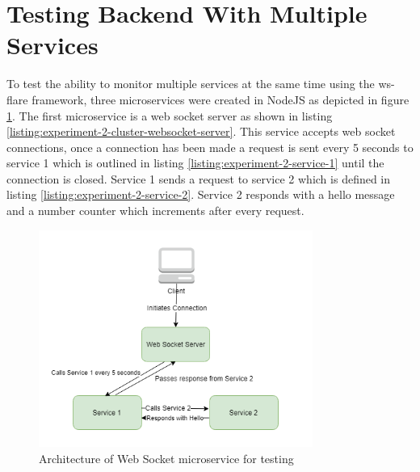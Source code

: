 \section{Testing Backend With Multiple Services}

To test the ability to monitor multiple services at the same time using the ws-flare framework, three microservices were created in NodeJS as depicted in figure \ref{fig:experiment-2-architecture}. The first microservice is a web socket server as shown in listing \ref{listing:experiment-2-cluster-websocket-server}. This service accepts web socket connections, once a connection has been made a request is sent every 5 seconds to service 1 which is outlined in listing \ref{listing:experiment-2-service-1} until the connection is closed. Service 1 sends a request to service 2 which is defined in listing \ref{listing:experiment-2-service-2}. Service 2 responds with a hello message and a number counter which increments after every request.

\begin{figure}[H]
  \centering
    \includegraphics[width=0.8\textwidth]{figures/experiments/experiment-2-multiple-services.png}
    \caption{Architecture of Web Socket microservice for testing}
    \label{fig:experiment-2-architecture}
\end{figure}

